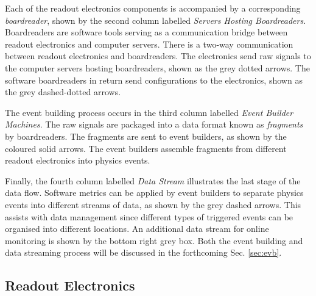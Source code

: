 Each of the readout electronics components is accompanied by a corresponding \textit{boardreader}, shown by the second column labelled \textit{Servers Hosting Boardreaders}.
Boardreaders are software tools serving as a communication bridge between readout electronics and computer servers.
There is a two-way communication between readout electronics and boardreaders.
The electronics send raw signals to the computer servers hosting boardreaders, shown as the grey dotted arrows.
The software boardreaders in return send configurations to the electronics, shown as the grey dashed-dotted arrows.

The event building process occurs in the third column labelled \textit{Event Builder Machines}.
The raw signals are packaged into a data format known as \textit{fragments} by boardreaders.
The fragments are sent to event builders, as shown by the coloured solid arrows.
The event builders assemble fragments from different readout electronics into physics events.
                        
Finally, the fourth column labelled \textit{Data Stream} illustrates the last stage of the data flow.
Software metrics can be applied by event builders to separate physics events into different streams of data, as shown by the grey dashed arrows.
This assists with data management since different types of triggered events can be organised into different locations.
An additional data stream for online monitoring is shown by the bottom right grey box.
Both the event building and data streaming process will be discussed in the forthcoming Sec. \ref{sec:evb}.



\subsection{Readout Electronics}
\label{sec:readout}

